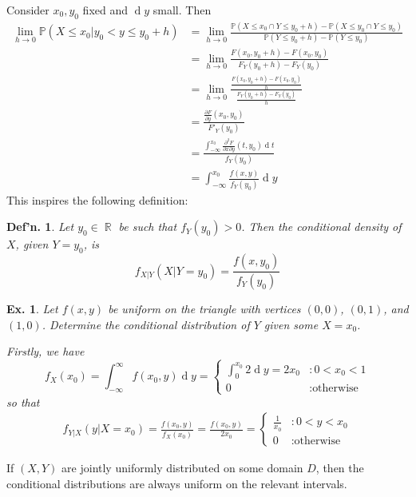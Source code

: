 \documentclass[12pt, a4paper]{book}
\DeclareMathOperator{\R}{\mathbb{R}}
\renewcommand{\Pr}{\mathbb{P}}
\renewcommand{\d}[1]{\ensuremath{\operatorname{d}\!{#1}}} %
\newtheorem{definition}[theorem]{Def'n.}
\newtheorem{example}[theorem]{Ex.}
\theoremstyle{nonumberplain}
\begin{document}
Consider $x_0,y_0$ fixed and $\d{y}$ small.
Then
\begin{align*}
    \lim_{h\to 0}\Pr(X\leq x_0|y_0<y\leq y_0+h) &= \lim_{h\to 0}\frac{\Pr(X\leq x_0\cap Y\leq y_0+h)-\Pr(X\leq y_0\cap Y\leq y_0)}{\Pr(Y\leq y_0+h)-\Pr(Y\leq y_0)}\\
                                                &= \lim_{h\to 0}\frac{F(x_0,y_0+h)-F(x_0,y_0)}{F_Y(y_0+h)-F_Y(y_0)}\\
                                                &= \lim_{h\to 0}\frac{\frac{F(x_0,y_0+h)-F(x_0,y_0)}{h}}{\frac{F_Y(y_0+h)-F_Y(y_0)}{h}}\\
                                                &= \frac{\frac{\partial F}{\partial y}(x_0,y_0)}{F'_Y(y_0)}\\
                                                &= \frac{\int_{-\infty}^{x_0}\frac{\partial^2F}{\partial x\partial y}(t,y_0)\d{t}}{f_Y(y_0)}\\
                                                &= \int_{-\infty}^{x_0}\frac{f(x,y)}{f_Y(y_0)}\d{y}
\end{align*}
This inspires the following definition:
\begin{definition}
    Let $y_0\in\R$ be such that $f_Y(y_0)>0$.
    Then the conditional density of $X$, given $Y=y_0$, is
    \[f_{X|Y}(X|Y=y_0)=\frac{f(x,y_0)}{f_Y(y_0)}\]
\end{definition}
\begin{example}
    Let $f(x,y)$ be uniform on the triangle with vertices $(0,0)$, $(0,1)$, and $(1,0)$.
    Determine the conditional distribution of $Y$ given some $X=x_0$.

    Firstly, we have
    \[f_X(x_0)=\int_{-\infty}^\infty f(x_0,y)\d{y}=\begin{cases}\int_0^{x_0}2\d{y}=2x_0 &:0<x_0<1\\0&:\text{otherwise}\end{cases}\]
    so that
    \begin{align*}
        f_{Y|X}(y|X=x_0)=\frac{f(x_0,y)}{f_X(x_0)}=\frac{f(x_0,y)}{2x_0}=
        \begin{cases}
            \frac{1}{x_0} &: 0<y<x_0\\
            0 &:\text{otherwise}
        \end{cases}
    \end{align*}
\end{example}
If $(X,Y)$ are jointly uniformly distributed on some domain $D$, then the conditional distributions are always uniform on the relevant intervals.
\end{document}
